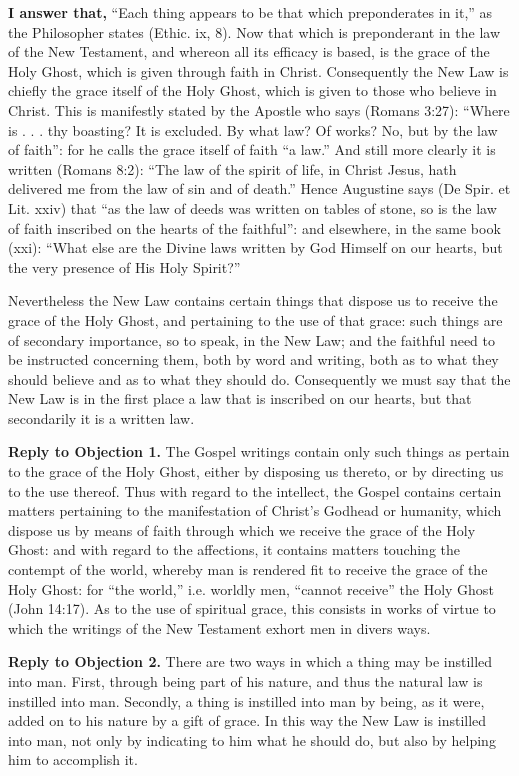 \textbf{I answer that,} ``Each thing appears to be that which preponderates in it,'' as the Philosopher states (Ethic. ix, 8). Now that which is preponderant in the law of the New Testament, and whereon all its efficacy is based, is the grace of the Holy Ghost, which is given through faith in Christ. Consequently the New Law is chiefly the grace itself of the Holy Ghost, which is given to those who believe in Christ. This is manifestly stated by the Apostle who says (Romans 3:27): ``Where is . . . thy boasting? It is excluded. By what law? Of works? No, but by the law of faith'': for he calls the grace itself of faith ``a law.'' And still more clearly it is written (Romans 8:2): ``The law of the spirit of life, in Christ Jesus, hath delivered me from the law of sin and of death.'' Hence Augustine says (De Spir. et Lit. xxiv) that ``as the law of deeds was written on tables of stone, so is the law of faith inscribed on the hearts of the faithful'': and elsewhere, in the same book (xxi): ``What else are the Divine laws written by God Himself on our hearts, but the very presence of His Holy Spirit?''

Nevertheless the New Law contains certain things that dispose us to receive the grace of the Holy Ghost, and pertaining to the use of that grace: such things are of secondary importance, so to speak, in the New Law; and the faithful need to be instructed concerning them, both by word and writing, both as to what they should believe and as to what they should do. Consequently we must say that the New Law is in the first place a law that is inscribed on our hearts, but that secondarily it is a written law.

\textbf{Reply to Objection 1.} The Gospel writings contain only such things as pertain to the grace of the Holy Ghost, either by disposing us thereto, or by directing us to the use thereof. Thus with regard to the intellect, the Gospel contains certain matters pertaining to the manifestation of Christ's Godhead or humanity, which dispose us by means of faith through which we receive the grace of the Holy Ghost: and with regard to the affections, it contains matters touching the contempt of the world, whereby man is rendered fit to receive the grace of the Holy Ghost: for ``the world,'' i.e. worldly men, ``cannot receive'' the Holy Ghost (John 14:17). As to the use of spiritual grace, this consists in works of virtue to which the writings of the New Testament exhort men in divers ways.

\textbf{Reply to Objection 2.} There are two ways in which a thing may be instilled into man. First, through being part of his nature, and thus the natural law is instilled into man. Secondly, a thing is instilled into man by being, as it were, added on to his nature by a gift of grace. In this way the New Law is instilled into man, not only by indicating to him what he should do, but also by helping him to accomplish it.

